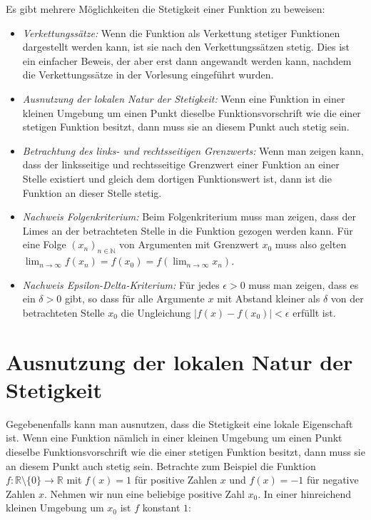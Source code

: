 \documentclass[fontsize=9pt,
               parskip=half-,
               DIV=14,
               listof=chapterentry,
               tocflat]{scrbook}
\begin{document}
Es gibt mehrere Möglichkeiten die Stetigkeit einer Funktion zu beweisen:

\begin{itemize}
\item \emph{Verkettungssätze:} Wenn die Funktion als Verkettung stetiger Funktionen dargestellt werden kann, ist sie nach den Verkettungssätzen stetig. Dies ist ein einfacher Beweis, der aber erst dann angewandt werden kann, nachdem die Verkettungssätze in der Vorlesung eingeführt wurden.
\item \emph{Ausnutzung der lokalen Natur der Stetigkeit:} Wenn eine Funktion in einer kleinen Umgebung um einen Punkt dieselbe Funktionsvorschrift wie die einer stetigen Funktion besitzt, dann muss sie an diesem Punkt auch stetig sein.
\item \emph{Betrachtung des links- und rechtsseitigen Grenzwerts:} Wenn man zeigen kann, dass der linksseitige und rechtsseitige Grenzwert einer Funktion an einer Stelle existiert und gleich dem dortigen Funktionswert ist, dann ist die Funktion an dieser Stelle stetig.
\item \emph{Nachweis Folgenkriterium:} Beim Folgenkriterium muss man zeigen, dass der Limes an der betrachteten Stelle in die Funktion gezogen werden kann. Für eine Folge $(x_{n})_{n\in \mathbb {N} }$ von Argumenten mit Grenzwert $x_{0}$ muss also gelten $\lim _{n\to \infty }f(x_{n})=f(x_{0})=f\left(\lim _{n\to \infty }x_{n}\right)$.
\item \emph{Nachweis Epsilon-Delta-Kriterium:} Für jedes $\epsilon >0$ muss man zeigen, dass es ein $\delta >0$ gibt, so dass für alle Argumente $x$ mit Abstand kleiner als $\delta $ von der betrachteten Stelle $x_{0}$ die Ungleichung $|f(x)-f(x_{0})|<\epsilon $ erfüllt ist.
\end{itemize}

\section{Ausnutzung der lokalen Natur der Stetigkeit}

Gegebenenfalls kann man ausnutzen, dass die Stetigkeit eine lokale Eigenschaft ist. Wenn eine Funktion nämlich in einer kleinen Umgebung um einen Punkt dieselbe Funktionsvorschrift wie die einer stetigen Funktion besitzt, dann muss sie an diesem Punkt auch stetig sein. Betrachte zum Beispiel die Funktion $f:\mathbb {R} \setminus \{0\}\to \mathbb {R} $ mit $f(x)=1$ für positive Zahlen $x$ und $f(x)=-1$ für negative Zahlen $x$. Nehmen wir nun eine beliebige positive Zahl $x_{0}$. In einer hinreichend kleinen Umgebung um $x_{0}$ ist $f$ konstant $1$:
\end{document}
